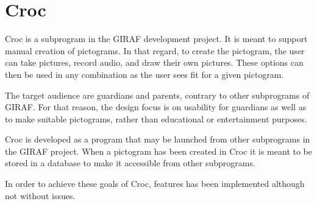 \section{Croc}
Croc is a subprogram in the GIRAF development project. 
It is meant to support manual creation of pictograms.
In that regard,  to create the pictogram, the user can take pictures, record audio, and draw their own pictures.
These options can then be used in any combination as the user sees fit for a given pictogram.

The target audience are guardians and parents, contrary to other subprograms of GIRAF. 
For that reason, the design focus is on usability for guardians as well as to make suitable pictograms, rather than educational or entertainment purposes.

Croc is developed as a program that may be launched from other subprograms in the GIRAF project.
When a pictogram has been created in Croc it is meant to be stored in a database to make it accessible from other subprograms.

In order to achieve these goals of Croc, features has been implemented although not without issues.

